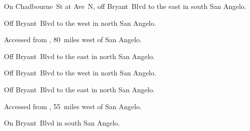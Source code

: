 

\begin{LocationList}

On  Chadbourne~St at Ave~N, off   Bryant~Blvd to the east in south San Angelo.

Off  Bryant~Blvd to the west in north San Angelo.

Accessed from , 80~miles west of San Angelo.

Off  Bryant~Blvd to the east in north San Angelo.

Off  Bryant~Blvd to the west in north San Angelo.

Off  Bryant~Blvd to the east in north San Angelo.

Accessed from , 55~miles west of San Angelo.

\Location{\TruckStop \Gas \Rest}
On   Bryant~Blvd in south San Angelo.

\end{LocationList}
